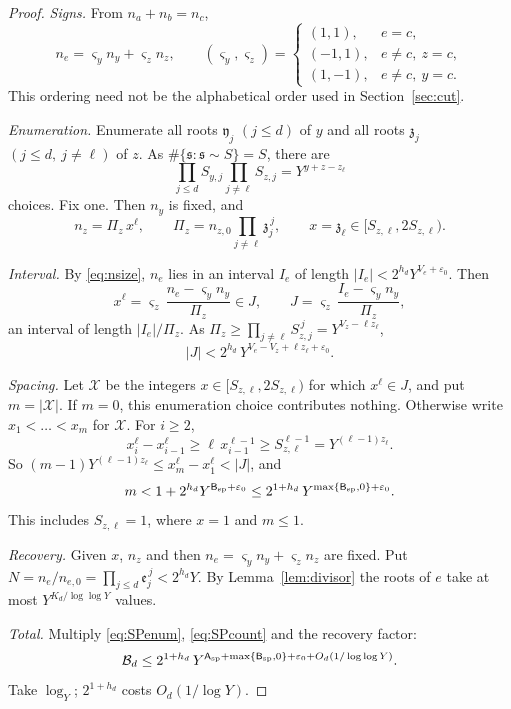 \documentclass{amsart}
\theoremstyle{definition}
\theoremstyle{plain}
\numberwithin{equation}{section}
\numberwithin{table}{section}
\newcommand{\pos}[1]{\max\{#1,0\}}
\begin{document}
\begin{proof}
\emph{Signs.} From $n_a+n_b=n_c$,
\[
 n_e=\varsigma_yn_y+\varsigma_zn_z,\qquad
 (\varsigma_y,\varsigma_z)=
 \begin{cases}
  (1,1),&e=c,\\
  (-1,1),&e\ne c,\ z=c,\\
  (1,-1),&e\ne c,\ y=c.
 \end{cases}
 \]
This ordering need not be the alphabetical order used in Section~\ref{sec:cut}.

\emph{Enumeration.} Enumerate all roots $\mathfrak y_j$ $(j\le d)$ of $y$ and
all roots $\mathfrak z_j$ $(j\le d,\ j\ne\ell)$ of $z$. As
$\#\{\mathfrak s:\mathfrak s\sim S\}=S$, there are
\begin{equation}\label{eq:SPenum}
 \prod_{j\le d}S_{y,j}\prod_{j\ne\ell}S_{z,j}=Y^{y+z-z_\ell}
\end{equation}
choices. Fix one. Then $n_y$ is fixed, and
\[
 n_z=\Pi_z\,x^\ell,\qquad \Pi_z=n_{z,0}\prod_{j\ne\ell}\mathfrak z_j^{\,j},\qquad
 x=\mathfrak z_\ell\in[S_{z,\ell},2S_{z,\ell}).
\]

\emph{Interval.} By \eqref{eq:nsize}, $n_e$ lies in an interval $I_e$ of length
$|I_e|<2^{h_d}Y^{V_e+\varepsilon_0}$. Then
\[
 x^\ell=\varsigma_z\,\frac{n_e-\varsigma_yn_y}{\Pi_z}\in J,
 \qquad J=\varsigma_z\,\frac{I_e-\varsigma_yn_y}{\Pi_z},
\]
an interval of length $|I_e|/\Pi_z$. As
$\Pi_z\ge\prod_{j\ne\ell}S_{z,j}^{\,j}=Y^{V_z-\ell z_\ell}$,
\[
 |J|<2^{h_d}\,Y^{V_e-V_z+\ell z_\ell+\varepsilon_0}.
\]

\emph{Spacing.} Let $\mathcal X$ be the integers
$x\in[S_{z,\ell},2S_{z,\ell})$ for which $x^\ell\in J$, and put
$m=|\mathcal X|$. If $m=0$, this enumeration choice contributes nothing.
Otherwise write $x_1<\dots<x_m$ for $\mathcal X$. For $i\ge2$,
\[
 x_i^\ell-x_{i-1}^\ell\ge \ell\,x_{i-1}^{\ell-1}\ge S_{z,\ell}^{\ell-1}=Y^{(\ell-1)z_\ell}.
\]
So $(m-1)Y^{(\ell-1)z_\ell}\le x_m^\ell-x_1^\ell<|J|$, and
\begin{equation}\label{eq:SPcount}
 m<1+2^{h_d}Y^{\mathsf B_{\rm sp}+\varepsilon_0}
 \le2^{1+h_d}\,Y^{\pos{\mathsf B_{\rm sp}}+\varepsilon_0}.
\end{equation}
This includes $S_{z,\ell}=1$, where $x=1$ and $m\le1$.

\emph{Recovery.} Given $x$, $n_z$ and then $n_e=\varsigma_yn_y+\varsigma_zn_z$ are
fixed. Put $N=n_e/n_{e,0}=\prod_{j\le d}\mathfrak e_j^{\,j}<2^{h_d}Y$. By
Lemma~\ref{lem:divisor} the roots of $e$ take at most
$Y^{K_d/\log\log Y}$ values.

\emph{Total.} Multiply \eqref{eq:SPenum}, \eqref{eq:SPcount} and the recovery
factor:
\[
 \mathcal B_d\le2^{1+h_d}\,
 Y^{\mathsf A_{\rm sp}+\pos{\mathsf B_{\rm sp}}+\varepsilon_0+O_d(1/\log\log Y)} .
\]
Take $\log_Y$; $2^{1+h_d}$ costs $O_d(1/\log Y)$.
\end{proof}
\end{document}
